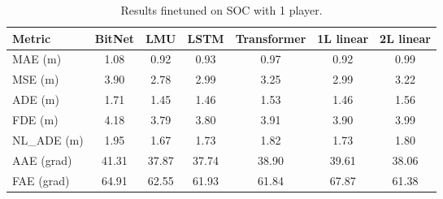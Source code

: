 \begin{table}[H]
\centering
\caption{Results finetuned on SOC with 1 player.}
\label{fine:SOC}
\begin{tabular}{l||c|c|c|c|c|c}

Metric & BitNet & LMU & LSTM & Transformer & 1L linear & 2L linear \\
\hline\hline
MAE (m) & 1.08 & 0.92 & 0.93 & 0.97 & 0.92 & 0.99 \\
MSE (m) & 3.90 & 2.78 & 2.99 & 3.25 & 2.99 & 3.22 \\
ADE (m) & 1.71 & 1.45 & 1.46 & 1.53 & 1.46 & 1.56 \\
FDE (m) & 4.18 & 3.79 & 3.80 & 3.91 & 3.90 & 3.99 \\
NL\_ADE (m) & 1.95 & 1.67 & 1.73 & 1.82 & 1.73 & 1.80 \\
AAE (grad) & 41.31 & 37.87 & 37.74 & 38.90 & 39.61 & 38.06 \\
FAE (grad) & 64.91 & 62.55 & 61.93 & 61.84 & 67.87 & 61.38 \\
\end{tabular}
\end{table}
